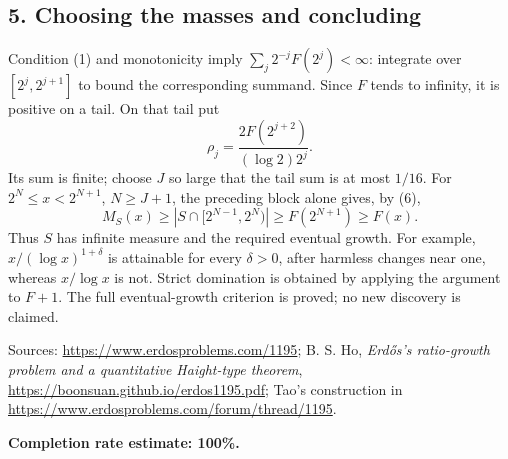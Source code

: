 \subsection*{5. Choosing the masses and concluding}
Condition (1) and monotonicity imply $\sum_j2^{-j}F(2^j)<\infty$: integrate over $[2^j,2^{j+1}]$ to bound the corresponding summand. Since $F$ tends to infinity, it is positive on a tail. On that tail put
\[
 \rho_j=\frac{2F(2^{j+2})}{(\log2)2^j}.
\]
Its sum is finite; choose $J$ so large that the tail sum is at most $1/16$. For $2^N\le x<2^{N+1}$, $N\ge J+1$, the preceding block alone gives, by (6),
\[
 M_S(x)\ge |S\cap[2^{N-1},2^N)|\ge F(2^{N+1})\ge F(x).
\]
Thus $S$ has infinite measure and the required eventual growth. For example, $x/(\log x)^{1+\delta}$ is attainable for every $\delta>0$, after harmless changes near one, whereas $x/\log x$ is not. Strict domination is obtained by applying the argument to $F+1$. The full eventual-growth criterion is proved; no new discovery is claimed.

Sources: \url{https://www.erdosproblems.com/1195}; B. S. Ho, \emph{Erd\H{o}s's ratio-growth problem and a quantitative Haight-type theorem}, \url{https://boonsuan.github.io/erdos1195.pdf}; Tao's construction in \url{https://www.erdosproblems.com/forum/thread/1195}.

\textbf{Completion rate estimate: 100\%.}
